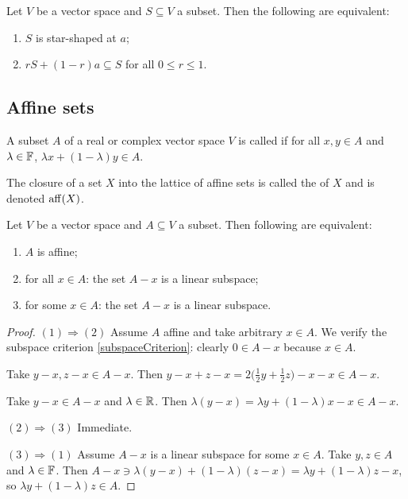 \begin{lemma}
Let $V$ be a vector space and $S\subseteq V$ a subset. Then the following are equivalent:
\begin{enumerate}
\item $S$ is star-shaped at $a$;
\item $r S + (1-r)a \subseteq S$ for all $0\leq r \leq 1$.
\end{enumerate}
\end{lemma}

\subsection{Affine sets}
\begin{definition}
A subset $A$ of a real or complex vector space $V$ is called  if for all $x,y\in A$ and $\lambda\in\mathbb{F}$, $\lambda x + (1-\lambda)y\in A$.

The closure of a set $X$ into the lattice of affine sets is called the  of $X$ and is denoted $\operatorname{aff}(X)$.
\end{definition}

\begin{proposition}
Let $V$ be a vector space and $A\subseteq V$ a subset. Then following are equivalent:
\begin{enumerate}
\item $A$ is affine;
\item for all $x\in A$: the set $A-x$ is a linear subspace;
\item for some $x\in A$: the set $A-x$ is a linear subspace.
\end{enumerate}
\end{proposition}
\begin{proof}
$(1) \Rightarrow (2)$ Assume $A$ affine and take arbitrary $x\in A$. We verify the subspace criterion \ref{subspaceCriterion}: clearly $0\in A-x$ because $x\in A$.

Take $y-x, z-x \in A-x$. Then $y-x + z-x = 2\Big(\frac{1}{2}y + \frac{1}{2}z\Big) - x -x \in A-x$.

Take $y-x\in A-x$ and $\lambda\in \mathbb{R}$. Then $\lambda(y-x) = \lambda y + (1-\lambda)x - x \in A-x$.

$(2) \Rightarrow (3)$ Immediate.

$(3) \Rightarrow (1)$ Assume $A-x$ is a linear subspace for some $x\in A$. Take $y,z\in A$ and $\lambda\in \mathbb{F}$. Then $A-x \ni \lambda(y-x)+(1-\lambda)(z-x) = \lambda y + (1-\lambda)z - x$, so $\lambda y + (1-\lambda)z \in A$. 
\end{proof}


